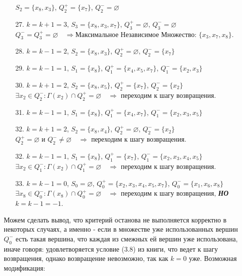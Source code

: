 \documentclass{article}
\begin{document}
\begin{enumerate}
\begin{enumerate}
        \quad $S_2 =\{x_8, x_3\}$,
        \quad  $Q_2^{+} =\{x_7\}$,
        \quad  $Q_2^{-} = \varnothing$
    \item[27.] $k = k + 1 = 3$,
        \quad $S_3 =\{x_8,x_3, x_7\}$,
        \quad  $Q_3^{+} =\varnothing$,
        \quad  $Q_3^{-} = \varnothing$\\
        $Q_3^{-} = Q_3^{+} = \varnothing\quad\Longrightarrow \textbf{Максимальное Независимое Множество: }\{x_3, x_7,x_8\}$.
     \item[28.] $k = k - 1 = 2$,
        \quad $S_2 =\{x_8,x_3\}$,
        \quad  $Q_2^{+} =\varnothing$,
        \quad  $Q_2^{-} = \{x_7\}$
     \item[29.] $k = k - 1 = 1$,
        \quad $S_1 =\{x_8\}$,
        \quad  $Q_1^{+} =\{x_4,x_5,x_7\}$,
        \quad  $Q_1^{-} = \{x_2,x_3\}$
    \item[30.] $k = k + 1 =2$,
        \quad $S_2 =\{x_8,x_5\}$,
        \quad  $Q_2^{+} =\{x_7\}$,
        \quad  $Q_2^{-} = \{x_2\}$\\
    $\exists x_2 \in Q_2^{-}: \Gamma (x_2) \cap Q_2^{+} = \varnothing\quad\Longrightarrow$ переходим к шагу возвращения.
    \item[31.] $k = k - 1 =1$,
        \quad $S_1 =\{x_8\}$,
        \quad  $Q_1^{+} =\{x_4,x_7\}$,
        \quad  $Q_1^{-} = \{x_2,x_3,x_5\}$
    \item[32.] $k = k + 1 =2$,
        \quad $S_2 =\{x_8,x_4\}$,
        \quad  $Q_2^{+} =\varnothing$,
        \quad  $Q_2^{-} = \{x_2\}$\\
    $Q_2^{+}=\varnothing\text{ и }Q_2^{-} \neq\varnothing\quad\Longrightarrow$ переходим к шагу возвращения.
    \item[32.] $k = k - 1 = 1$,
        \quad $S_1 =\{x_8\}$,
        \quad  $Q_1^{+} =\{x_7\}$,
        \quad  $Q_1^{-} = \{x_2,x_3,x_4,x_5\}$\\
    $\exists x_2 \in Q_1^{-}: \Gamma (x_2) \cap Q_1^{+} = \varnothing\quad\Longrightarrow$ переходим к шагу возвращения.
    \item[33.] $k = k - 1 = 0$,
        \quad $S_0 =\varnothing$,
        \quad  $Q_0^{+} =\{x_2,x_3,x_4,x_5,x_7\}$,
        \quad  $Q_0^{-} = \{x_1,x_6,x_8\}$\\
    $\exists x_8 \in Q_0^{-}: \Gamma (x_8) \cap Q_0  ^{+} = \varnothing\quad\Longrightarrow$ переходим к шагу возвращения, \textbf{\textit{НО}} $k = k - 1 = -1$.
    \\
\end{enumerate}
{\color{blue} Можем сделать вывод, что критерий останова не выполняется корректно в некоторых случаях, а именно - если в множестве уже использованных вершин $Q_0^{-}$ есть такая вершина, что каждая из смежных ей вершин уже использована, иначе говоря: удовлетворяется условие (3.8) из книги, что ведет к шагу возвращения, однако возвращение невозможно, так как $k = 0$ уже. Возможная модификация:
}
\end{enumerate}
\end{document}
